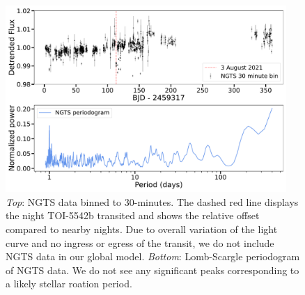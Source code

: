 \documentclass{aa}
\begin{document}
\begin{appendix}
\begin{figure}
  \centering
  \includegraphics[width=0.95\textwidth]{figures/TIC466206508_NGTS_30min.pdf}
 \caption{\textit{Top}: NGTS data binned to 30-minutes. The dashed red line displays the night TOI-5542b transited and shows the relative offset compared to nearby nights. Due to overall variation of the light curve and no ingress or egress of the transit, we do not include NGTS data in our global model. \textit{Bottom}: Lomb-Scargle periodogram of NGTS data. We do not see any significant peaks corresponding to a likely stellar roation period.}
  \label{fig:ngts_full}
\end{figure}


\end{appendix}
\end{document}
